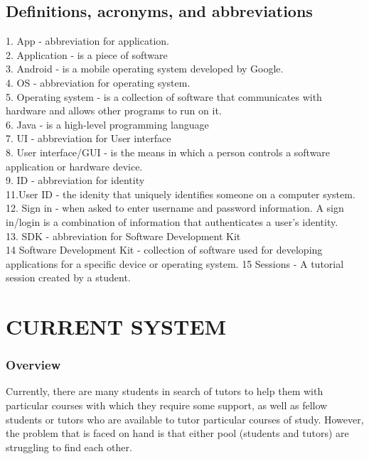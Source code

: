 \documentclass[12pt]{article}
\begin{document}
\subsection{Definitions, acronyms, and abbreviations}
1. App - abbreviation for application. \\
2. Application - is a piece of software \\
3. Android - is a mobile operating system developed by Google. \\
4. OS - abbreviation for operating system.\\
5. Operating system - is a collection of software that communicates with hardware and allows other programs to run on it.\\
6. Java - is a high-level programming language\\
7. UI - abbreviation for User interface\\
8. User interface/GUI - is the means in which a person controls a software application or hardware device.\\
9. ID - abbreviation for identity\\
11.User ID - the idenity that uniquely identifies someone on a computer system.\\
12. Sign in - when asked to enter username and password information. A sign in/login is a combination of information that authenticates a user's identity. \\
13. SDK - abbreviation for Software Development Kit\\
14 Software Development Kit -  collection of software used for developing applications for a specific device or operating system.
15 Sessions - A tutorial session created by a student.




\newpage


\section{CURRENT SYSTEM}
\subsubsection{Overview}
\begin{flushleft}

Currently, there are many students in search of tutors to help them with particular courses with which they require some support, as well as fellow students or tutors who are available to tutor particular courses of study. However, the problem that is faced on hand is that either pool (students and tutors) are struggling to find each other.
\end{flushleft}
\end{document}
